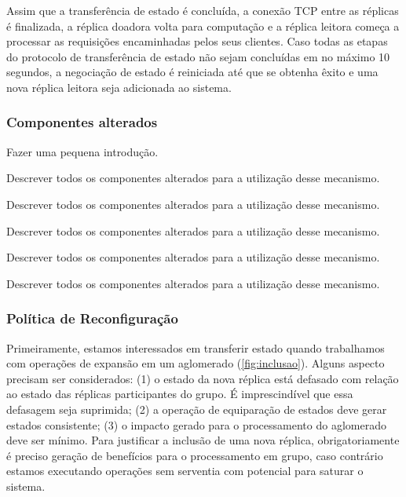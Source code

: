 Assim que a transferência de estado é concluída, a conexão TCP entre as réplicas é
finalizada, a réplica doadora volta para computação e a réplica leitora começa a processar
as requisições encaminhadas pelos seus clientes. Caso todas as etapas do protocolo de
transferência de estado não sejam concluídas em no máximo 10 segundos, a negociação de
estado  é reiniciada até que se obtenha êxito e uma nova  réplica leitora seja adicionada
ao sistema.

\subsubsection{Componentes alterados}

Fazer uma pequena introdução.


Descrever todos os componentes alterados para a utilização desse mecanismo.


Descrever todos os componentes alterados para a utilização desse mecanismo.


Descrever todos os componentes alterados para a utilização desse mecanismo.


Descrever todos os componentes alterados para a utilização desse mecanismo.


Descrever todos os componentes alterados para a utilização desse mecanismo.

\subsubsection{Política de Reconfiguração}

Primeiramente, estamos interessados em transferir estado quando trabalhamos com operações
de expansão em um aglomerado (\autoref{fig:inclusao}). Alguns aspecto precisam ser
considerados: (1) o estado da nova réplica está defasado com relação ao estado das
réplicas participantes do grupo. É imprescindível que essa defasagem seja suprimida; (2) a
operação de equiparação de estados deve gerar estados consistente; (3) o impacto gerado
para o processamento do aglomerado deve ser mínimo. Para justificar a inclusão de uma nova
réplica, obrigatoriamente é preciso geração de benefícios para o processamento em grupo,
caso contrário estamos executando operações sem serventia com potencial para saturar o
sistema.


